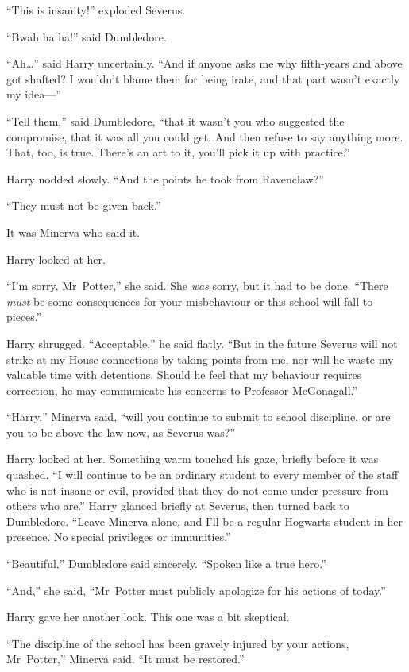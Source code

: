 “This is insanity!” exploded Severus.

“Bwah ha ha!” said Dumbledore.

“Ah…” said Harry uncertainly. “And if anyone asks me why fifth-years and above got shafted? I wouldn’t blame them for being irate, and that part wasn’t exactly my idea—”

“Tell them,” said Dumbledore, “that it wasn’t you who suggested the compromise, that it was all you could get. And then refuse to say anything more. That, too, is true. There’s an art to it, you’ll pick it up with practice.”

Harry nodded slowly. “And the points he took from Ravenclaw?”

“They must not be given back.”

It was Minerva who said it.

Harry looked at her.

“I’m sorry, Mr~Potter,” she said. She \emph{was} sorry, but it had to be done. “There \emph{must} be some consequences for your misbehaviour or this school will fall to pieces.”

Harry shrugged. “Acceptable,” he said flatly. “But in the future Severus will not strike at my House connections by taking points from me, nor will he waste my valuable time with detentions. Should he feel that my behaviour requires correction, he may communicate his concerns to Professor McGonagall.”

“Harry,” Minerva said, “will you continue to submit to school discipline, or are you to be above the law now, as Severus was?”

Harry looked at her. Something warm touched his gaze, briefly before it was quashed. “I will continue to be an ordinary student to every member of the staff who is not insane or evil, provided that they do not come under pressure from others who are.” Harry glanced briefly at Severus, then turned back to Dumbledore. “Leave Minerva alone, and I’ll be a regular Hogwarts student in her presence. No special privileges or immunities.”

“Beautiful,” Dumbledore said sincerely. “Spoken like a true hero.”

“And,” she said, “Mr~Potter must publicly apologize for his actions of today.”

Harry gave her another look. This one was a bit skeptical.

“The discipline of the school has been gravely injured by your actions, Mr~Potter,” Minerva said. “It must be restored.”

